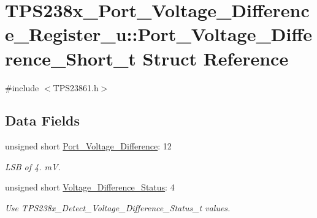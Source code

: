 \hypertarget{struct_t_p_s238x___port___voltage___difference___register__u_1_1_port___voltage___difference___short__t}{\section{T\-P\-S238x\-\_\-\-Port\-\_\-\-Voltage\-\_\-\-Difference\-\_\-\-Register\-\_\-u\-:\-:Port\-\_\-\-Voltage\-\_\-\-Difference\-\_\-\-Short\-\_\-t Struct Reference}
\label{struct_t_p_s238x___port___voltage___difference___register__u_1_1_port___voltage___difference___short__t}
}


{\ttfamily \#include $<$T\-P\-S23861.\-h$>$}

\subsection*{Data Fields}
\begin{DoxyCompactItemize}
\item 
unsigned short \hyperlink{struct_t_p_s238x___port___voltage___difference___register__u_1_1_port___voltage___difference___short__t_a185b7daf835effbcdab5b73b2b5dbb1f}{Port\-\_\-\-Voltage\-\_\-\-Difference}\-: 12
\begin{DoxyCompactList}\small\item\em L\-S\-B of 4. m\-V. \end{DoxyCompactList}\item 
unsigned short \hyperlink{struct_t_p_s238x___port___voltage___difference___register__u_1_1_port___voltage___difference___short__t_a1d4d1c9d3114fb7c7ca011c257a44275}{Voltage\-\_\-\-Difference\-\_\-\-Status}\-: 4
\begin{DoxyCompactList}\small\item\em Use T\-P\-S238x\-\_\-\-Detect\-\_\-\-Voltage\-\_\-\-Difference\-\_\-\-Status\-\_\-t values. \end{DoxyCompactList}\end{DoxyCompactItemize}


